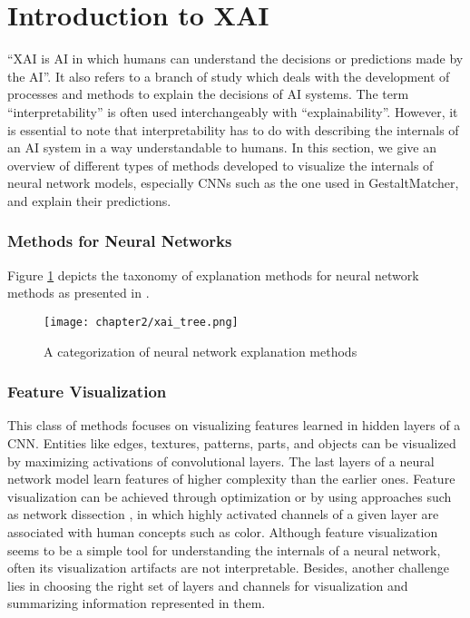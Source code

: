 \documentclass[../report.tex]{subfiles}
\begin{document}
    \section{Introduction to XAI}
    \noindent
    \raggedbottom
	\enquote{XAI is AI in which humans can understand the decisions or predictions made by the AI}\cite{vilone2021notions}. It also refers to a branch of study which deals with the development of processes and methods to explain the decisions of AI systems. The term \enquote{interpretability} is often used interchangeably with \enquote{explainability}. However, it is essential to note that interpretability has to do with describing the internals of an AI system in a way understandable to humans. In this section, we give an overview of different types of methods developed to visualize the internals of neural network models, especially CNNs such as the one used in GestaltMatcher, and explain their predictions.
	
	\subsubsection{Methods for Neural Networks} \label{sec_nn_methods}
	Figure \ref{fig_xai_tree} depicts the taxonomy of explanation methods for neural network methods as presented in \cite{molnar2019}. 
	  \begin{figure}[ht]
		\hspace*{1.0cm}      
		\texttt{[image: chapter2/xai\_tree.png]}
		\caption{A categorization of neural network explanation methods}
		\label{fig_xai_tree}
	\end{figure}
	\subsubsection{Feature Visualization}
	This class of methods focuses on visualizing features learned in hidden layers of a CNN. Entities like edges, textures, patterns, parts, and objects can be visualized by maximizing activations of convolutional layers. The last layers of a neural network model learn features of higher complexity than the earlier ones.  Feature visualization can be achieved through optimization or by using approaches such as network dissection \cite{bau2017network}, in which highly activated channels of a given layer are associated with human concepts such as color. Although feature visualization seems to be a simple tool for understanding the internals of a neural network, often its visualization artifacts are not interpretable. Besides, another challenge lies in choosing the right set of layers and channels for visualization and summarizing information represented in them.
\end{document}
